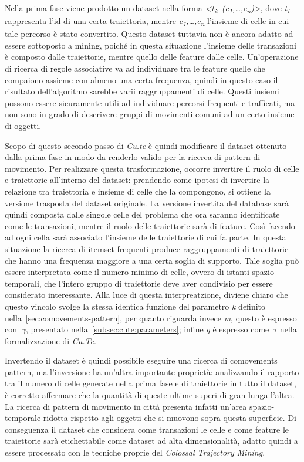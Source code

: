 Nella prima fase viene prodotto un dataset nella forma \textit{<t\textsubscript{i}, (c\textsubscript{1},\ldots,c\textsubscript{n})>},
dove \textit{t\textsubscript{i}} rappresenta l'id di una certa traiettoria, mentre \textit{c\textsubscript{1},\ldots,c\textsubscript{n}}
l'insieme di celle in cui tale percorso è stato convertito.
Questo dataset tuttavia non è ancora adatto ad essere sottoposto a mining, poiché in questa situazione l'insieme delle transazioni è composto dalle traiettorie,
mentre quello delle feature dalle celle.
Un'operazione di ricerca di regole associative va ad individuare tra le feature quelle che compaiono assieme con almeno una certa frequenza,
quindi in questo caso il risultato dell'algoritmo sarebbe varii raggruppamenti di celle.
Questi insiemi possono essere sicuramente utili ad individuare percorsi frequenti e trafficati, ma non sono in grado di descrivere gruppi di movimenti comuni ad un certo insieme di oggetti.

Scopo di questo secondo passo di \textit{Cu.te} è quindi modificare il dataset ottenuto dalla prima fase
in modo da renderlo valido per la ricerca di pattern di movimento.
Per realizzare questa trasformazione, occorre invertire il ruolo di celle e traiettorie all'interno del dataset: prendendo come
ipotesi di invertire la relazione tra traiettoria e insieme di celle che la compongono, si ottiene la versione trasposta del dataset originale.
La versione invertita del database sarà quindi composta dalle singole celle del problema che ora saranno identificate
come le transazioni, mentre il ruolo delle traiettorie sarà di feature. Così facendo ad ogni cella sarà associato l'insieme delle traiettorie di cui
fa parte.
In questa situazione la ricerca di itemset frequenti produce raggruppamenti di traiettorie che hanno una frequenza maggiore
a una certa soglia di supporto.
Tale soglia può essere interpretata come il numero minimo di celle, ovvero di istanti spazio-temporali, che
l'intero gruppo di traiettorie deve aver condivisio per essere considerato interessante.
Alla luce di questa interpreatzione, diviene chiaro che questo vincolo svolge la stessa identica funzione del parametro \textit{k} definito nella~\cref{sec:comovements-pattern},
per quanto riguarda invece \textit{m}, questo è espresso con  \(~\gamma \), presentato nella~\cref{subsec:cute:parameters}; infine \textit{g} è espresso come \(~\tau \) nella formalizzazione di \textit{Cu.Te}.

Invertendo il dataset è quindi possibile eseguire una ricerca di comovements pattern, ma l'inversione ha un'altra importante proprietà:
analizzando il rapporto tra il numero di celle generate nella prima fase e di traiettorie in tutto il dataset, è corretto affermare che
la quantità di queste ultime superi di gran lunga l'altra. La ricerca di pattern di movimento in città presenta infatti un'area spazio-temporale
ridotta rispetto agli oggetti che si muovono sopra questa superficie.
Di conseguenza il dataset che considera come transazioni le celle e come feature le traiettorie sarà etichettabile come dataset ad alta dimensionalità, adatto quindi a essere processato con le tecniche proprie del
\textit{Colossal Trajectory Mining}.


